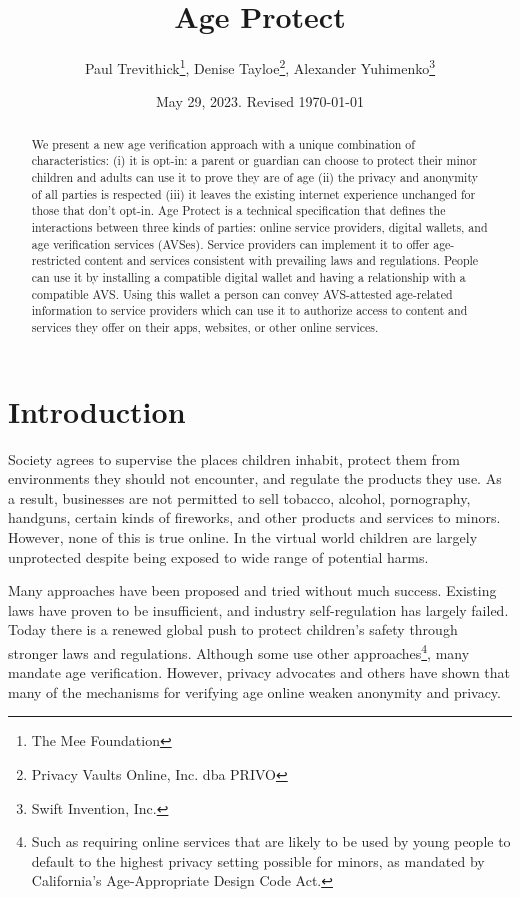 \documentclass[11pt, oneside]{article}   	%
\title{Age Protect}
\author{Paul Trevithick\footnote{The Mee Foundation}, Denise Tayloe\footnote{Privacy Vaults Online, Inc. dba PRIVO}, Alexander Yuhimenko\footnote{Swift Invention, Inc.}}
\date{May 29, 2023. Revised \today}
\begin{document}
\maketitle
\begin{abstract}
	We present a new age verification approach with a unique combination of characteristics: (i) it is opt-in: a parent or guardian can choose to protect their minor children and adults can use it to prove they are of age (ii) the privacy and anonymity of all parties is respected (iii) it leaves the existing internet experience unchanged for those that don't opt-in. Age Protect is a technical specification that defines the interactions between three kinds of parties: online service providers, digital wallets, and age verification services (AVSes). Service providers can implement it to offer age-restricted content and services consistent with prevailing laws and regulations. People can use it by installing a compatible digital wallet and having a relationship with a compatible AVS. Using this wallet a person can convey AVS-attested age-related information to service providers which can use it to authorize access to content and services they offer on their apps, websites, or other online services. 
\end{abstract}

\section{Introduction}

Society agrees to supervise the places children inhabit, protect them from environments they should not encounter, and regulate the products they use. As a result, businesses are not permitted to sell tobacco, alcohol, pornography, handguns, certain kinds of fireworks, and other products and services to minors. However, none of this is true online. In the virtual world children are largely unprotected despite being exposed to wide range of potential harms. 

Many approaches have been proposed and tried without much success. Existing laws have proven to be insufficient, and industry self-regulation has largely failed. Today there is a renewed global push to protect children's safety through stronger laws and regulations. Although some use other approaches\footnote{Such as requiring online services that are likely to be used by young people to default to the highest privacy setting possible for minors, as mandated by California's Age-Appropriate Design Code Act.}, many mandate age verification.\cite{Griswold2023}\cite{Jackson2023} However, privacy advocates and others have shown that many of the mechanisms for verifying age online weaken anonymity and privacy.\cite{Roth2023} 
\end{document}
